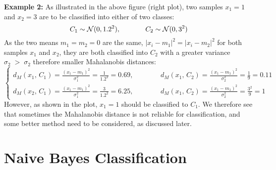 \documentclass{article}
\begin{document}
\begin{itemize}
  {\bf Example 2:} As illustrated in the above figure (right plot), two
  samples $x_1=1$ and $x_2=3$ are to be classified into either of two 
  classes:  
  \begin{equation}
    C_1\sim{\cal N}(0, 1.2^2),\;\;\;\;\;\;\;\;\;\;\;\;\;
    C_2\sim{\cal N}(0, 3^2)
  \end{equation}
  As the two means $m_1=m_2=0$ are the same, $|x_i-m_1|^2=|x_i-m_2|^2$ 
  for both samples $x_1$ and $x_2$, they are both classified into $C_2$ 
  with a greater variance $\sigma_2\;> \;\sigma_2$ therefore smaller
  Mahalanobis distances:
  \begin{equation}
    \left\{
    \begin{array}{l}
    d_M(x_1,\,C_1)=\frac{(x_1-m_1)^2}{\sigma_1^2}=\frac{1}{1.2^2}=0.69,
    \;\;\;\;\;\;\;\;\;\;\;\;\;\;
    d_M(x_1,\,C_2)=\frac{(x_1-m_1)^2}{\sigma_2^2}=\frac{1}{9}=0.11\\
    d_M(x_2,\,C_1)=\frac{(x_1-m_1)^2}{\sigma_1^2}=\frac{3}{1.2^2}=6.25,
    \;\;\;\;\;\;\;\;\;\;\;\;\;\;
    d_M(x_1,\,C_2)=\frac{(x_1-m_1)^2}{\sigma_2^2}=\frac{3^2}{9}=1
    \end{array}\right.
  \end{equation}
  However, as shown in the plot, $x_1=1$ should be classified to $C_1$.
  We therefore see that sometimes the Mahalanobis distance is not reliable
  for classification, and some better method need to be considered, as 
  discussed later.

\end{itemize}


\section{Naive Bayes Classification}
\end{document}

